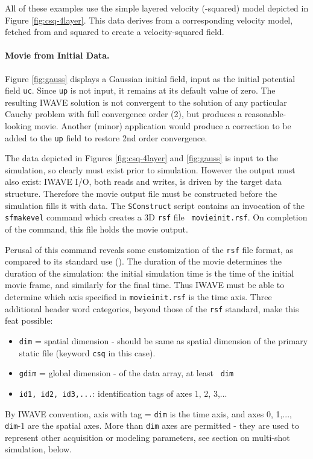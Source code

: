 All of these examples use the simple layered velocity
(-squared) model depicted in Figure \ref{fig:csq-4layer}. 
This data derives from a corresponding velocity model, fetched from
and squared to create a velocity-squared field.


\noindent \paragraph{Movie from Initial Data.} 
Figure \ref{fig:gauss}
displays a Gaussian initial field, input as the initial potential
field {\tt uc}.  Since  {\tt up} is not input, it remains at its
default value of zero. The resulting IWAVE solution is not convergent
to the solution of any particular Cauchy problem with full convergence
order (2), but produces a reasonable-looking movie. Another (minor)
application would produce a correction to be added to the {\tt up}
field to restore 2nd order convergence.


The data depicted in Figures \ref{fig:csq-4layer} and \ref{fig:gauss}
is input to the simulation, so clearly must exist prior to
simulation. However the output must also exist: IWAVE I/O, both reads
and writes, is driven by the target data structure. Therefore the
movie output file must be constructed before the simulation fills it
with data. The {\tt SConstruct} script contains an invocation of the
{\tt sfmakevel} command which creates a 3D {\tt rsf} file {\tt
  movieinit.rsf}. On completion of the command, this file holds the
movie output.

Perusal of this command reveals some customization of the {\tt rsf}
file format, as compared to its standard use (\cite{Madagascar}). The
duration of the movie determines the duration of the simulation: the
initial simulation time is the time of the initial movie frame, and
similarly for the final time. Thus IWAVE must be able to determine
which axis specified in {\tt movieinit.rsf} is the time axis. Three
additional header word categories, beyond those of the {\tt rsf}
standard, make this feat possible:
\begin{itemize}
\item {\tt dim} = spatial dimension - should be same as spatial
  dimension of the primary static file (keyword {\tt csq} in this
  case).
\item {\tt gdim} = global dimension - of the data array, at least {\tt
    dim}
\item {\tt id1, id2, id3,...}: identification tags of axes 1, 2, 3,...
\end{itemize}
By IWAVE convention, axis with tag = {\tt dim} is the time axis, and axes 0,
1,..., {\tt dim}-1 are the spatial axes. More than {\tt dim} axes are
permitted - they are used to represent other acquisition or modeling
parameters, see section on multi-shot simulation, below.

